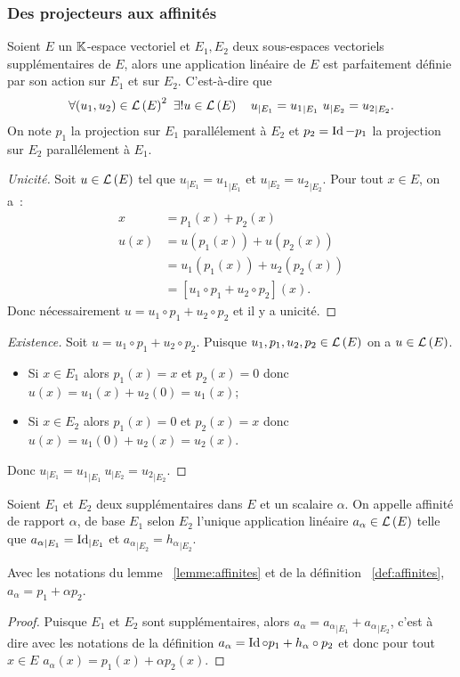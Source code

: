 \subsubsection{Des projecteurs aux affinités}
\begin{lemme}\label{lemme:affinites}
  Soient \(E\) un \(\mathbb{K}\)-espace vectoriel et \(E_1,E_2\) deux sous-espaces vectoriels supplémentaires de \(E\), alors une application linéaire de \(E\) est parfaitement définie par son action sur \(E_1\) et sur \(E_2\). C'est-à-dire que
  \begin{equation}
    \forall (u_1,u_2) \in \Endo{E}^2 \ \exists! u \in \Endo{E} \quad u_{|E_1}={u_1}_{|E_1} \ u_{|E_2}={u_2}_{|E_2}.
  \end{equation}
  On note \(p_1\) la projection sur \(E_1\) parallélement à \(E_2\) et \(p_2=\operatorname{Id}-p_1\) la projection sur \(E_2\) parallélement à \(E_1\).
\end{lemme}
\begin{proof}[Unicité]
  Soit \(u \in \mathcal{L}\left(E\right)\) tel que \(u_{|E_1}={u_1}_{|E_1}\) et  \(u_{|E_2}={u_2}_{|E_2}\). Pour tout \(x \in E\), on a~:
  \begin{align}
    x&=p_1(x)+p_2(x)\\
    u(x)&=u(p_1(x))+u(p_2(x))\\
        &=u_1(p_1(x)) +u_2(p_2(x))\\
        &=[u_1\circ p_1 +u_2 \circ p_2](x).
  \end{align}
  Donc nécessairement \(u=u_1\circ p_1 +u_2 \circ p_2\) et il y a unicité.
\end{proof}
\begin{proof}[Existence]
  Soit \(u=u_1\circ p_1 +u_2 \circ p_2\). Puisque \(u_1,p_1,u_2,p_2 \in \mathcal{L}\left(E\right)\) on a \(u \in \mathcal{L}\left(E\right)\).
  \begin{itemize}
    \item Si \(x \in E_1\) alors \(p_1(x)=x\) et \(p_2(x)=0\) donc \(u(x)=u_1(x)+u_2(0)=u_1(x)\);
    \item Si \(x \in E_2\) alors \(p_1(x)=0\) et \(p_2(x)=x\) donc \(u(x)=u_1(0)+u_2(x)=u_2(x)\).
  \end{itemize}
  Donc \(u_{|E_1}={u_1}_{|E_1} \ u_{|E_2}={u_2}_{|E_2}\).
\end{proof}
%
\begin{defdef}\label{def:affinites}
  Soient \(E_1\) et \(E_2\) deux supplémentaires dans \(E\) et un scalaire \(\alpha\). On appelle affinité de rapport \(\alpha\), de base \(E_1\) selon \(E_2\) l'unique application linéaire \(a_\alpha \in \mathcal{L}\left(E\right)\) telle que \({a_\alpha}_{|E_1} = \operatorname{Id}_{|E_1}\) et \({a_\alpha}_{|E_2} = {h_\alpha}_{|E_2}\).
\end{defdef}
%
\begin{prop}
  Avec les notations du lemme~
  \ref{lemme:affinites} et de la définition~
  \ref{def:affinites}, \(a_{\alpha}=p_1+\alpha p_2\).
\end{prop}
\begin{proof}
  Puisque \(E_1\) et \(E_2\) sont supplémentaires, alors \(a_\alpha= {a_\alpha}_{|E_1} + {a_\alpha}_{|E_2}\), c'est à dire avec les notations de la définition \(a_\alpha= \operatorname{Id} \circ p_1 + h_\alpha \circ p_2\) et donc pour tout \(x \in E\) \(a_\alpha(x)=p_1(x)+\alpha p_2(x)\).
\end{proof}


